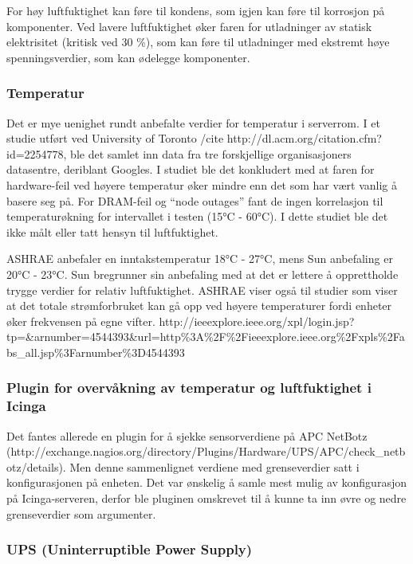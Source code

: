 For høy luftfuktighet kan føre til kondens, som igjen kan føre til korrosjon på komponenter. Ved lavere luftfuktighet øker faren for utladninger av statisk elektrisitet (kritisk ved 30 \%), som kan føre til utladninger med ekstremt høye spenningsverdier, som kan ødelegge komponenter.

\subsubsection{Temperatur}

Det er mye uenighet rundt anbefalte verdier for temperatur i serverrom. I et studie utført ved University of Toronto /cite http://dl.acm.org/citation.cfm?id=2254778, ble det samlet inn data fra tre forskjellige organisasjoners datasentre, deriblant Googles. I studiet ble det konkludert med at faren for hardware-feil ved høyere temperatur øker mindre enn det som har vært vanlig å basere seg på. For DRAM-feil og ``node outages'' fant de ingen korrelasjon til temperaturøkning for intervallet i testen (15°C - 60°C). I dette studiet ble det ikke målt eller tatt hensyn til luftfuktighet. 

ASHRAE anbefaler en inntakstemperatur 18°C - 27°C, mens Sun anbefaling er 20°C - 23°C. Sun bregrunner sin anbefaling med at det er lettere å opprettholde trygge verdier for relativ luftfuktighet. ASHRAE viser også til studier som viser at det totale strømforbruket kan gå opp ved høyere temperaturer fordi enheter øker frekvensen på egne vifter. http://ieeexplore.ieee.org/xpl/login.jsp?tp=\&arnumber=4544393\&url=http\%3A\%2F\%2Fieeexplore.ieee.org\%2Fxpls\%2Fabs\_all.jsp\%3Farnumber\%3D4544393

\subsubsection{Plugin for overvåkning av temperatur og luftfuktighet i Icinga}

Det fantes allerede en plugin for å sjekke sensorverdiene på APC NetBotz (http://exchange.nagios.org/directory/Plugins/Hardware/UPS/APC/check\_netbotz/details). Men denne sammenlignet verdiene med grenseverdier satt i konfigurasjonen på enheten. Det var ønskelig å samle mest mulig av konfigurasjon på Icinga-serveren, derfor ble pluginen omskrevet til å kunne ta inn øvre og nedre grenseverdier som argumenter.

\subsubsection{UPS (Uninterruptible Power Supply)}

